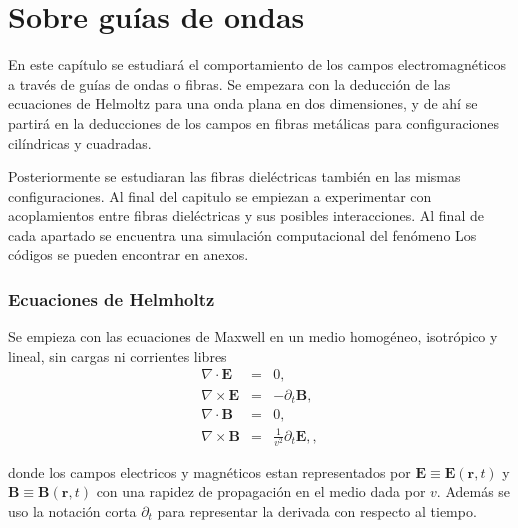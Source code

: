 \chapter{Sobre guías de ondas}
\par En este capítulo se estudiará el comportamiento de los campos electromagnéticos a través de guías de ondas o fibras. Se empezara con la deducción de las ecuaciones de Helmoltz para una onda plana en dos dimensiones, y de ahí se partirá en la deducciones de los campos en fibras metálicas para configuraciones cilíndricas y cuadradas. \par Posteriormente se estudiaran las fibras dieléctricas también en las mismas configuraciones. Al final del capitulo se empiezan a experimentar con acoplamientos entre fibras dieléctricas y sus posibles interacciones. Al final de cada apartado se encuentra una simulación computacional del fenómeno Los códigos se pueden encontrar en anexos.
\subsection{Ecuaciones de Helmholtz}
\par Se empieza con las ecuaciones de Maxwell en un medio homogéneo, isotrópico y lineal, sin cargas ni corrientes libres \cite{GriffithsElec}
\begin{subequations}\label{Maxwell}
	\begin{eqnarray}
	\nabla \cdot \mathbf{E} &=& 0,\label{Primera}\\
	\nabla \times \mathbf{E} &=& - \partial_{t} \mathbf{B},\label{segunda}\\
	\nabla \cdot \mathbf{B} &=& 0,\label{tercera}\\
	\nabla \times \mathbf{B} &=&  \frac{1}{v^2} \partial_{t} \mathbf{E},\label{cuarta},
	\end{eqnarray}
\end{subequations}
\par donde los campos electricos y magnéticos estan representados por $\mathbf{E} \equiv \mathbf{E}(\mathbf{r},t)$ y $\mathbf{B} \equiv \mathbf{B}(\mathbf{r},t)$ con una rapidez de propagación en el medio dada por $v$. Además se uso la notación corta $\partial_{t}$ para representar la derivada con respecto al tiempo.


